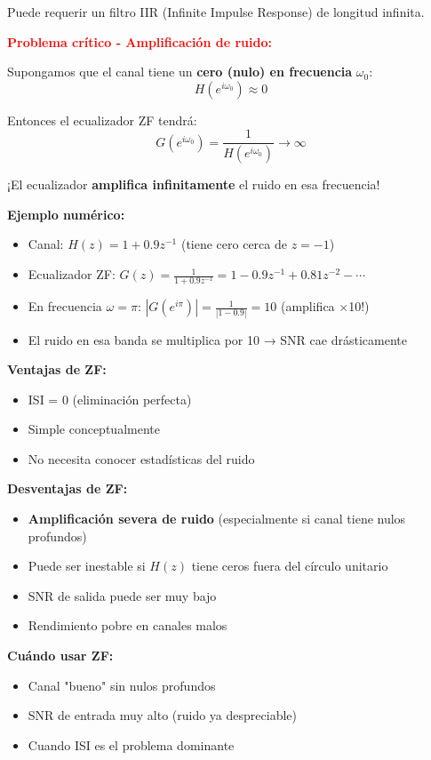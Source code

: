\documentclass[10pt,a4paper]{article}
\begin{document}
Puede requerir un filtro IIR (Infinite Impulse Response) de longitud infinita.

\textbf{\textcolor{red}{Problema crítico - Amplificación de ruido:}}

Supongamos que el canal tiene un \textbf{cero (nulo) en frecuencia} $\omega_0$:
$$H(e^{i\omega_0}) \approx 0$$

Entonces el ecualizador ZF tendrá:
$$G(e^{i\omega_0}) = \frac{1}{H(e^{i\omega_0})} \to \infty$$

¡El ecualizador \textbf{amplifica infinitamente} el ruido en esa frecuencia!

\textbf{Ejemplo numérico:}
\begin{itemize}
\item Canal: $H(z) = 1 + 0.9z^{-1}$ (tiene cero cerca de $z=-1$)
\item Ecualizador ZF: $G(z) = \frac{1}{1+0.9z^{-1}} = 1 - 0.9z^{-1} + 0.81z^{-2} - \cdots$
\item En frecuencia $\omega = \pi$: $|G(e^{i\pi})| = \frac{1}{|1-0.9|} = 10$ (amplifica $\times$10!)
\item El ruido en esa banda se multiplica por 10 → SNR cae drásticamente
\end{itemize}

\textbf{Ventajas de ZF:}
\begin{itemize}
\item ISI = 0 (eliminación perfecta)
\item Simple conceptualmente
\item No necesita conocer estadísticas del ruido
\end{itemize}

\textbf{Desventajas de ZF:}
\begin{itemize}
\item \textbf{Amplificación severa de ruido} (especialmente si canal tiene nulos profundos)
\item Puede ser inestable si $H(z)$ tiene ceros fuera del círculo unitario
\item SNR de salida puede ser muy bajo
\item Rendimiento pobre en canales malos
\end{itemize}

\textbf{Cuándo usar ZF:}
\begin{itemize}
\item Canal "bueno" sin nulos profundos
\item SNR de entrada muy alto (ruido ya despreciable)
\item Cuando ISI es el problema dominante
\end{itemize}
\end{document}
